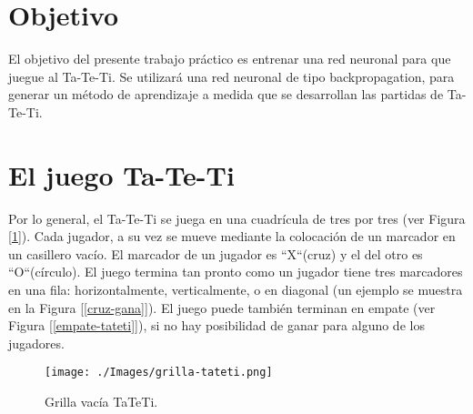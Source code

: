 \documentclass[12pt,titlepage]{article}
\begin{document}

\pagestyle{fancy}
\lhead{}
\chead{}
\rhead{}
\cfoot{}
\rfoot{\\\thepage}
\renewcommand{\headrulewidth}{0pt}



\setcounter{page}{2}

\newpage
\thispagestyle{empty}
\tableofcontents
\newpage



\section{Objetivo}
El objetivo del presente trabajo pr\'actico es entrenar una red neuronal para que juegue al Ta-Te-Ti. Se utilizar\'a una red neuronal de tipo backpropagation, para generar un m\'etodo de aprendizaje a medida que se desarrollan las partidas de Ta-Te-Ti.

\section{El juego Ta-Te-Ti}
Por lo general, el Ta-Te-Ti se juega en una cuadrícula de tres por tres (ver Figura [\ref{grilla-vacia}]). Cada jugador, a su vez se mueve mediante la colocación de un marcador en un casillero vac\'io. El marcador de un jugador es ``X``(cruz) y el del otro es ``O``(c\'irculo). El juego termina tan pronto como un jugador tiene tres marcadores en una fila: horizontalmente, verticalmente, o en diagonal (un ejemplo se muestra en la Figura [\ref{cruz-gana}]). El juego puede también terminan en empate (ver Figura [\ref{empate-tateti}]), si no hay posibilidad de ganar para alguno de los jugadores.

\begin{figure}[h!]
 \centering
 \texttt{[image: ./Images/grilla-tateti.png]}
 \caption{Grilla vac\'ia TaTeTi.}
 \label{grilla-vacia}
\end{figure}
\end{document}
